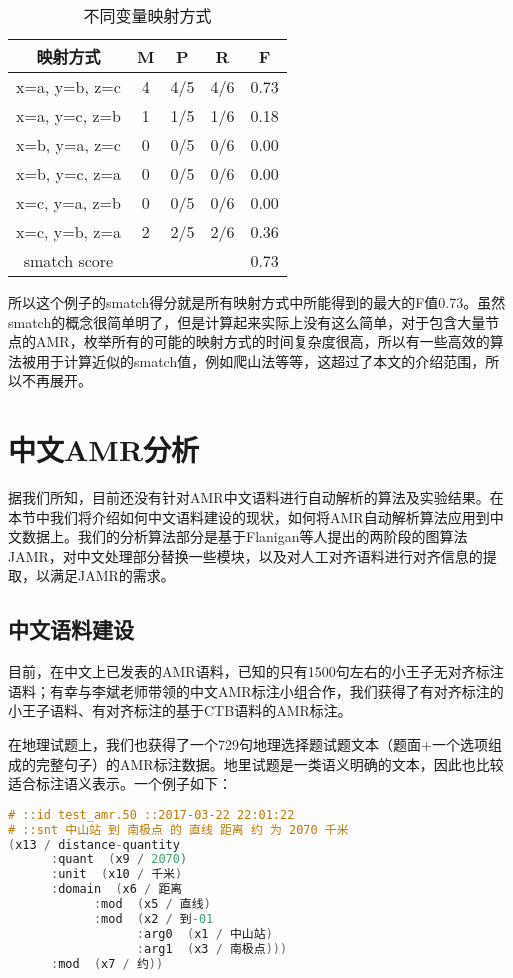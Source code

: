 \documentclass[master, winfont]{njuthesis}
\begin{document}
\begin{table}[!htbp]
\begin{center}
\begin{tabular}{c|c|c|c|c}
\hline {映射方式} & {M} & {P} & {R} & {F} \\
\hline x=a, y=b, z=c & 4 & 4/5 & 4/6 & 0.73 \\
\hline x=a, y=c, z=b & 1 & 1/5 & 1/6 & 0.18 \\
\hline x=b, y=a, z=c & 0 & 0/5 & 0/6 & 0.00 \\
\hline x=b, y=c, z=a & 0 & 0/5 & 0/6 & 0.00 \\
\hline x=c, y=a, z=b & 0 & 0/5 & 0/6 & 0.00 \\
\hline x=c, y=b, z=a & 2 & 2/5 & 2/6 & 0.36 \\
\hline smatch score & \multicolumn{4}{r}{0.73}\\
\hline
\end{tabular}
\end{center}
\caption{\label{smatch_table} 不同变量映射方式}
\end{table}

所以这个例子的smatch得分就是所有映射方式中所能得到的最大的F值0.73。虽然smatch的概念很简单明了，但是计算起来实际上没有这么简单，对于包含大量节点的AMR，枚举所有的可能的映射方式的时间复杂度很高，所以有一些高效的算法被用于计算近似的smatch值，例如爬山法等等，这超过了本文的介绍范围，所以不再展开。

\section{中文AMR分析}
据我们所知，目前还没有针对AMR中文语料进行自动解析的算法及实验结果。在本节中我们将介绍如何中文语料建设的现状，如何将AMR自动解析算法应用到中文数据上。我们的分析算法部分是基于Flanigan等人\cite{Flanigan2014}提出的两阶段的图算法JAMR，对中文处理部分替换一些模块，以及对人工对齐语料进行对齐信息的提取，以满足JAMR的需求。

\subsection{中文语料建设}
目前，在中文上已发表的AMR语料，已知的只有1500句左右的小王子无对齐标注语料\cite{Li2016Annotating}；有幸与李斌老师带领的中文AMR标注小组合作，我们获得了有对齐标注的小王子语料、有对齐标注的基于CTB语料的AMR标注。

在地理试题上，我们也获得了一个729句地理选择题试题文本（题面+一个选项组成的完整句子）的AMR标注数据。地里试题是一类语义明确的文本，因此也比较适合标注语义表示。一个例子如下：
\begin{lstlisting}[language=C]
# ::id test_amr.50 ::2017-03-22 22:01:22
# ::snt 中山站 到 南极点 的 直线 距离 约 为 2070 千米
(x13 / distance-quantity
      :quant  (x9 / 2070)
      :unit  (x10 / 千米)
      :domain  (x6 / 距离
            :mod  (x5 / 直线)
            :mod  (x2 / 到-01
                  :arg0  (x1 / 中山站)
                  :arg1  (x3 / 南极点)))
      :mod  (x7 / 约))
\end{lstlisting}
\end{document}
